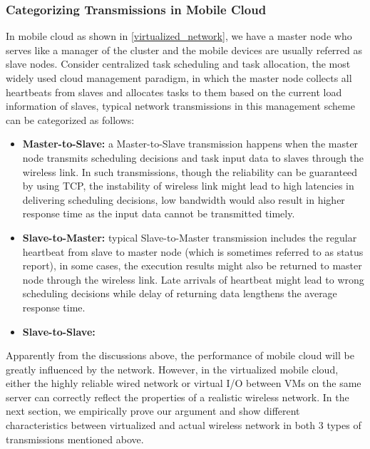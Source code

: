 \documentclass[journal,comsoc]{IEEEtran}
\begin{document}
\subsubsection{Categorizing Transmissions in Mobile Cloud}
In mobile cloud as shown in \ref{virtualized_network}, we have a master node who serves like a manager of the cluster and the mobile devices are usually referred as slave nodes. Consider centralized task scheduling and task allocation, the most widely used cloud management paradigm, in which the master node collects all heartbeats from slaves and allocates tasks to them based on the current load information of slaves, typical network transmissions in this management scheme can be categorized as follows:
\begin{itemize}
	\item {\bf Master-to-Slave: }a Master-to-Slave transmission happens when the master node transmits scheduling decisions and task input data to slaves through the wireless link. In such transmissions, though the reliability can be guaranteed by using TCP, the instability of wireless link might lead to high latencies in delivering scheduling decisions, low bandwidth would also result in higher response time as the input data cannot be transmitted timely.
	\item {\bf Slave-to-Master: }typical Slave-to-Master transmission includes the regular heartbeat from slave to master node (which is sometimes referred to as status report), in some cases, the execution results might also be returned to master node through the wireless link. Late arrivals of heartbeat might lead to wrong scheduling decisions while delay of returning data lengthens the average response time.
	\item {\bf Slave-to-Slave: }
\end{itemize}
Apparently from the discussions above, the performance of mobile cloud will be greatly influenced by the network. However, in the virtualized mobile cloud, either the highly reliable wired network or virtual I/O between VMs on the same server can correctly reflect the properties of a realistic wireless network. In the next section, we empirically prove our argument and show different characteristics between virtualized and actual wireless network in both 3 types of transmissions mentioned above.
\end{document}
